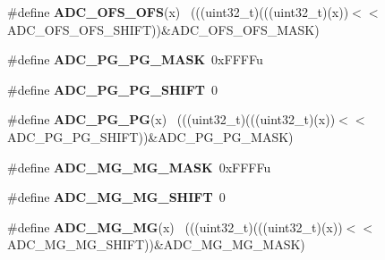 \begin{DoxyCompactItemize}
\item 
\hypertarget{group___a_d_c___register___masks_ga05a86dc2179bf28986dac6c3b8f2ad86}{}\#define {\bfseries A\+D\+C\+\_\+\+O\+F\+S\+\_\+\+O\+F\+S}(x)                                                  ~(((uint32\+\_\+t)(((uint32\+\_\+t)(x))$<$$<$A\+D\+C\+\_\+\+O\+F\+S\+\_\+\+O\+F\+S\+\_\+\+S\+H\+I\+F\+T))\&A\+D\+C\+\_\+\+O\+F\+S\+\_\+\+O\+F\+S\+\_\+\+M\+A\+S\+K)\label{group___a_d_c___register___masks_ga05a86dc2179bf28986dac6c3b8f2ad86}

\item 
\hypertarget{group___a_d_c___register___masks_ga0619279d8dcf43af1fda9f27090ae51b}{}\#define {\bfseries A\+D\+C\+\_\+\+P\+G\+\_\+\+P\+G\+\_\+\+M\+A\+S\+K}~0x\+F\+F\+F\+Fu\label{group___a_d_c___register___masks_ga0619279d8dcf43af1fda9f27090ae51b}

\item 
\hypertarget{group___a_d_c___register___masks_ga014623fb35c473d12ff7fc64c3e8cfe3}{}\#define {\bfseries A\+D\+C\+\_\+\+P\+G\+\_\+\+P\+G\+\_\+\+S\+H\+I\+F\+T}~0\label{group___a_d_c___register___masks_ga014623fb35c473d12ff7fc64c3e8cfe3}

\item 
\hypertarget{group___a_d_c___register___masks_gaee91977cfc6901ece0f38f9129a6bb8d}{}\#define {\bfseries A\+D\+C\+\_\+\+P\+G\+\_\+\+P\+G}(x)                                                      ~(((uint32\+\_\+t)(((uint32\+\_\+t)(x))$<$$<$A\+D\+C\+\_\+\+P\+G\+\_\+\+P\+G\+\_\+\+S\+H\+I\+F\+T))\&A\+D\+C\+\_\+\+P\+G\+\_\+\+P\+G\+\_\+\+M\+A\+S\+K)\label{group___a_d_c___register___masks_gaee91977cfc6901ece0f38f9129a6bb8d}

\item 
\hypertarget{group___a_d_c___register___masks_ga9f415258af1bad0159dd605efccd043b}{}\#define {\bfseries A\+D\+C\+\_\+\+M\+G\+\_\+\+M\+G\+\_\+\+M\+A\+S\+K}~0x\+F\+F\+F\+Fu\label{group___a_d_c___register___masks_ga9f415258af1bad0159dd605efccd043b}

\item 
\hypertarget{group___a_d_c___register___masks_ga4b2717da089f0de5bd41ef91001b7cfe}{}\#define {\bfseries A\+D\+C\+\_\+\+M\+G\+\_\+\+M\+G\+\_\+\+S\+H\+I\+F\+T}~0\label{group___a_d_c___register___masks_ga4b2717da089f0de5bd41ef91001b7cfe}

\item 
\hypertarget{group___a_d_c___register___masks_gac6b5db2e032965ca7bf626469aaeb8c3}{}\#define {\bfseries A\+D\+C\+\_\+\+M\+G\+\_\+\+M\+G}(x)                                                      ~(((uint32\+\_\+t)(((uint32\+\_\+t)(x))$<$$<$A\+D\+C\+\_\+\+M\+G\+\_\+\+M\+G\+\_\+\+S\+H\+I\+F\+T))\&A\+D\+C\+\_\+\+M\+G\+\_\+\+M\+G\+\_\+\+M\+A\+S\+K)\label{group___a_d_c___register___masks_gac6b5db2e032965ca7bf626469aaeb8c3}


\end{DoxyCompactItemize}
